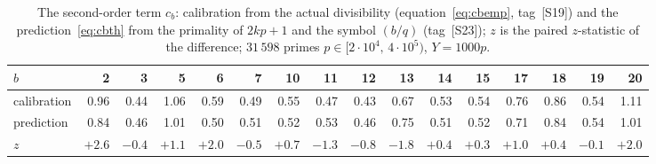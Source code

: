 \documentclass[11pt,a4paper]{article}
\theoremstyle{plain}
\theoremstyle{remark}
\begin{document}
\begin{table}[t]
\centering
\caption{The second-order term $c_b$: calibration from the actual divisibility
(equation~\eqref{eq:cbemp}, tag~[S19]) and the prediction~\eqref{eq:cbth} from the primality
of $2kp+1$ and the symbol $(b/q)$ (tag~[S23]); $z$ is the paired $z$-statistic of
the difference; $31\,598$ primes $p\in[2\cdot10^4,\,4\cdot10^5)$, $Y=1000p$.}
\label{tab:cbth}
\small
\setlength{\tabcolsep}{2.6pt}
\begin{tabular}{lrrrrrrrrrrrrrrr}
\toprule
$b$ & 2 & 3 & 5 & 6 & 7 & 10 & 11 & 12 & 13 & 14 & 15 & 17 & 18 & 19 & 20\\
\midrule
calibration & 0.96 & 0.44 & 1.06 & 0.59 & 0.49 & 0.55 & 0.47 & 0.43 & 0.67 & 0.53 & 0.54 & 0.76 & 0.86 & 0.54 & 1.11\\
prediction & 0.84 & 0.46 & 1.01 & 0.50 & 0.51 & 0.52 & 0.53 & 0.46 & 0.75 & 0.51 & 0.52 & 0.71 & 0.84 & 0.54 & 1.01\\
$z$ & $+2.6$ & $-0.4$ & $+1.1$ & $+2.0$ & $-0.5$ & $+0.7$ & $-1.3$ & $-0.8$ & $-1.8$ & $+0.4$ & $+0.3$ & $+1.0$ & $+0.4$ & $-0.1$ & $+2.0$\\
\bottomrule
\end{tabular}
\end{table}
\end{document}
